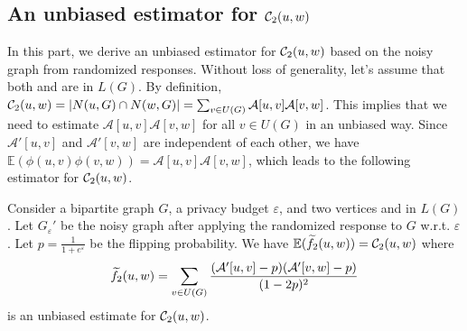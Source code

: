 \subsection{An unbiased estimator for $\mathcal{C}_2(u,w)$}
In this part, we derive an unbiased estimator for $\mathcal{C}_2(u,w)$ based on the noisy graph from randomized responses. 
{\color{black}Without loss of generality, let's assume that both \vq and \vx are in $L(G)$. 
By definition, $\mathcal{C}_2(u,w) = | N(u, G) \cap N(w, G)  | = 
\sum_{v \in U(G) } \mathcal{A}[u,v] \mathcal{A}[v,w]$. 
This implies that we need to estimate $\mathcal{A}[u,v] \mathcal{A}[v,w]$ for all $v \in U(G)$ in an unbiased way. 
Since $\mathcal{A}'[u,v]$ and $\mathcal{A}'[v,w]$ are independent of each other, we have $\mathbb{E}(\phi(u, v) \phi(v, w)) = \mathcal{A}[u,v] \mathcal{A}[v,w]$, which leads to the following estimator for $\mathcal{C}_2(u,w)$. }

\begin{theorem}
\label{thm:f2}
Consider a bipartite graph $G$, a privacy budget $\varepsilon$, and two vertices \vq and \vx in $L(G)$. 
Let $G_{\varepsilon}'$ be the noisy graph after applying the randomized response to $G$ w.r.t. $\varepsilon$. 
Let $p = \frac{1}{1+e^{\varepsilon}}$ be the flipping probability. 
We have
$
\mathbb{E}( \widetilde{f}_2(u, w) ) = \mathcal{C}_2(u,w)
$
where  
\begin{align}
    \widetilde{f}_2(u, w) = \sum_{ v \in U(G)}  \frac{(\mathcal{A}'[u,v] - p) (\mathcal{A}'[v,w] - p )}{(1-2p)^2}
    \label{eq:fbs}
\end{align}
is an unbiased estimate for $\mathcal{C}_2(u,w)$. 
\end{theorem}

